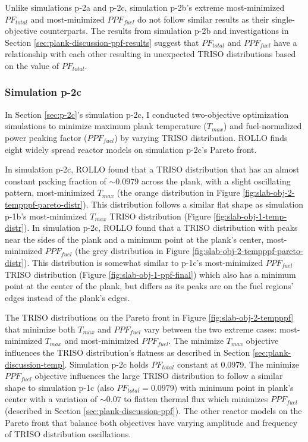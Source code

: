 Unlike simulations p-2a and p-2c, simulation p-2b's extreme most-minimized $PF_{total}$ 
and most-minimized $PPF_{fuel}$ do not follow similar results as their single-objective 
counterparts.  
The results from simulation p-2b and investigations in Section 
\ref{sec:plank-discussion-ppf-results} suggest that $PF_{total}$ and $PPF_{fuel}$
have a relationship with each other resulting in unexpected TRISO distributions based 
on the value of $PF_{total}$. 

\subsubsection{Simulation p-2c}
In Section \ref{sec:p-2c}'s simulation p-2c, I conducted two-objective 
optimization simulations to minimize maximum plank temperature ($T_{max}$) and 
fuel-normalized power peaking factor ($PPF_{fuel}$) by varying TRISO distribution. 
\gls{ROLLO} finds eight widely spread reactor models on simulation p-2c's Pareto 
front. 

In simulation p-2c, \gls{ROLLO} found that a TRISO distribution that has an almost 
constant packing fraction of $\sim0.0979$ across the plank, with a 
slight oscillating pattern, most-minimized $T_{max}$ 
(the orange distribution in Figure \ref{fig:slab-obj-2-tempppf-pareto-distr}). 
This distribution follows a similar flat shape as simulation p-1b's most-minimized 
$T_{max}$ TRISO distribution (Figure \ref{fig:slab-obj-1-temp-distr}).
In simulation p-2c, \gls{ROLLO} found that a TRISO distribution with peaks near the 
sides of the plank and a minimum point at the plank's center, most-minimized 
$PPF_{fuel}$ (the grey distribution in Figure 
\ref{fig:slab-obj-2-tempppf-pareto-distr}). 
This distribution is somewhat similar to p-1c's most-minimized $PPF_{fuel}$ TRISO 
distribution (Figure \ref{fig:slab-obj-1-ppf-final}) which also has a minimum point 
at the center of the plank, but differs as its peaks are on the fuel regions' edges 
instead of the plank's edges. 

The \gls{TRISO} distributions on the Pareto front in Figure \ref{fig:slab-obj-2-tempppf} 
that minimize both $T_{max}$ and $PPF_{fuel}$ vary between the two extreme cases: 
most-minimized $T_{max}$ and most-minimized $PPF_{fuel}$. 
The minimize $T_{max}$ objective influences the TRISO distribution's flatness as 
described in Section \ref{sec:plank-discussion-temp}.
Simulation p-2c holds $PF_{total}$ constant at 0.0979. 
The minimize $PPF_{fuel}$ objective influences the large TRISO distribution to follow 
a similar shape to simulation p-1c (also $PF_{total} = 0.0979$) with minimum point in 
plank's center with a variation of $\sim0.07$ to flatten thermal flux which 
minimizes $PPF_{fuel}$ (described in Section \ref{sec:plank-discussion-ppf}). 
The other reactor models on the Pareto front that balance both objectives have 
varying amplitude and frequency of TRISO distribution oscillations. 

